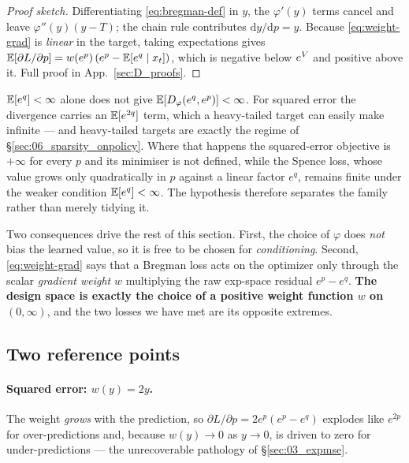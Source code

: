 \begin{proof}[Proof sketch]
Differentiating \eqref{eq:bregman-def} in $y$, the $\varphi'(y)$ terms cancel
and leave $\varphi''(y)(y-T)$; the chain rule contributes
$\mathrm{d}y/\mathrm{d}p = y$. Because \eqref{eq:weight-grad} is \emph{linear}
in the target, taking expectations gives
$\mathbb{E}[\partial L/\partial p] = w(e^{p})\,(e^{p}-\mathbb{E}[e^{q}\mid x_t])$, which is
negative below $e^{V}$ and positive above it. Full proof in
App.~\ref{sec:D_proofs}.
\end{proof}

\begin{remark}
$\mathbb{E}[e^{q}]<\infty$ alone does not give $\mathbb{E}[D_{\varphi}(e^{q},e^{p})]<\infty$. For
squared error the divergence carries an $\mathbb{E}[e^{2q}]$ term, which a
heavy-tailed target can easily make infinite --- and heavy-tailed targets are
exactly the regime of \S\ref{sec:06_sparsity_onpolicy}. Where that happens the
squared-error objective is $+\infty$ for every $p$ and its minimiser is not
defined, while the Spence loss, whose value grows only quadratically in $p$
against a linear factor $e^{q}$, remains finite under the weaker condition
$\mathbb{E}[e^{q}]<\infty$. The hypothesis therefore separates the family rather than
merely tidying it.
\end{remark}

\noindent Two consequences drive the rest of this section. First, the choice of
$\varphi$ does \emph{not} bias the learned value, so it is free to be chosen for
\emph{conditioning}. Second, \eqref{eq:weight-grad} says that a Bregman loss
acts on the optimizer only through the scalar \emph{gradient weight} $w$
multiplying the raw exp-space residual $e^{p}-e^{q}$. \textbf{The design space
is exactly the choice of a positive weight function $w$ on $(0,\infty)$}, and
the two losses we have met are its opposite extremes.

\subsection{Two reference points}

\paragraph{Squared error: $w(y)=2y$.}
The weight \emph{grows} with the prediction, so
$\partial L/\partial p = 2e^{p}(e^{p}-e^{q})$ explodes like $e^{2p}$ for
over-predictions and, because $w(y)\to0$ as $y\to0$, is driven to zero for
under-predictions --- the unrecoverable pathology of \S\ref{sec:03_expmse}.

